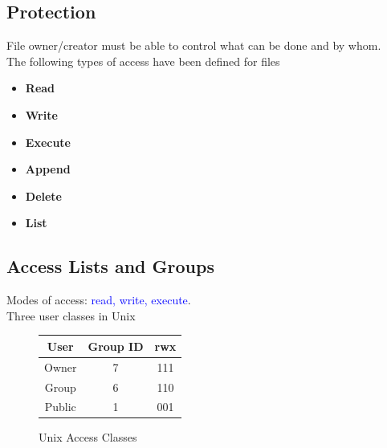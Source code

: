 \documentclass[oneside]{book}
\begin{document}
            \subsection{Protection}
                File owner/creator must be able to control what can be done and by whom.\\
                The following types of access have been defined for files
                \begin{itemize}
                    \item \textbf{Read}
                    \item \textbf{Write}
                    \item \textbf{Execute}
                    \item \textbf{Append}
                    \item \textbf{Delete}
                    \item \textbf{List}
                \end{itemize}
            \subsection{Access Lists and Groups}
                Modes of access: \textcolor{blue}{read, write, execute}.\\
                Three user classes in Unix
                \begin{figure}[H]
                    \centering
                    \begin{tabular}{ccc}
                        \textbf{User} & \textbf{Group ID} & \textbf{rwx} \\
                        \toprule
                        Owner & 7 & 111 \\
                        Group & 6 & 110 \\
                        Public & 1 & 001 \\
                    \end{tabular}
                    \caption{Unix Access Classes}
                \end{figure}
\end{document}
